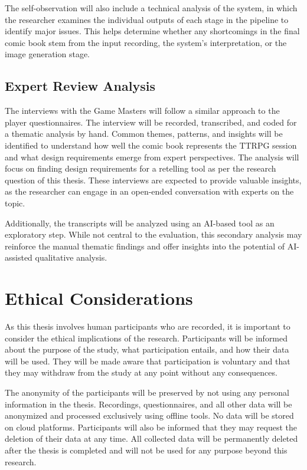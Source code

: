 The self-observation will also include a technical analysis of the system, in which the researcher examines the individual outputs of each stage in the pipeline to identify major issues. This helps determine whether any shortcomings in the final comic book stem from the input recording, the system's interpretation, or the image generation stage.

\subsection*{Expert Review Analysis}
The interviews with the Game Masters will follow a similar approach to the player questionnaires. The interview will be recorded, transcribed, and coded for a thematic analysis by hand. Common themes, patterns, and insights will be identified to understand how well the comic book represents the TTRPG session and what design requirements emerge from expert perspectives. The analysis will focus on finding design requirements for a retelling tool as per the research question of this thesis. These interviews are expected to provide valuable insights, as the researcher can engage in an open-ended conversation with experts on the topic. 

Additionally, the transcripts will be analyzed using an AI-based tool as an exploratory step. While not central to the evaluation, this secondary analysis may reinforce the manual thematic findings and offer insights into the potential of AI-assisted qualitative analysis.

\section{Ethical Considerations}
As this thesis involves human participants who are recorded, it is important to consider the ethical implications of the research. Participants will be informed about the purpose of the study, what participation entails, and how their data will be used. They will be made aware that participation is voluntary and that they may withdraw from the study at any point without any consequences.

The anonymity of the participants will be preserved by not using any personal information in the thesis. Recordings, questionnaires, and all other data will be anonymized and processed exclusively using offline tools. No data will be stored on cloud platforms. Participants will also be informed that they may request the deletion of their data at any time. All collected data will be permanently deleted after the thesis is completed and will not be used for any purpose beyond this research.

